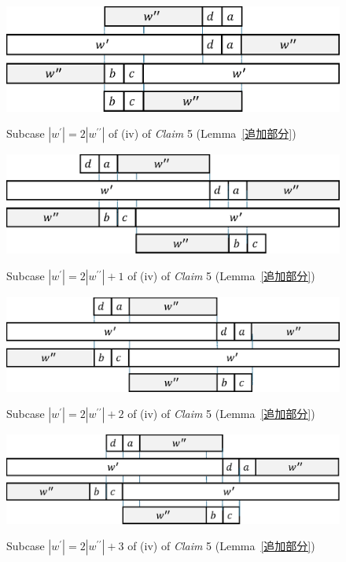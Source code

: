 \begin{figure}[t]
\begin{center}
  \includegraphics[scale=0.45]{figs/w=2w_1.eps}
  \caption{Subcase $|w^{\prime}| = 2|w^{\prime\prime}|$ of (iv) of \textit{Claim} 5 (Lemma~\ref{追加部分})}\label{追加部分14}
  \bigskip
  \includegraphics[scale=0.45]{figs/w=2w_1+1.eps}
  \caption{Subcase $|w^{\prime}| = 2|w^{\prime\prime}| + 1$ of (iv) of \textit{Claim} 5 (Lemma~\ref{追加部分})}\label{追加部分13}
  \bigskip
  \includegraphics[scale=0.45]{figs/w=2w_1+2.eps}
  \caption{Subcase $|w^{\prime}| = 2|w^{\prime\prime}| + 2$ of (iv) of \textit{Claim} 5 (Lemma~\ref{追加部分})}\label{追加部分12}
  \bigskip
  \includegraphics[scale=0.45]{figs/w=2w_1+3.eps}
  \caption{Subcase $|w^{\prime}| = 2|w^{\prime\prime}| + 3$ of (iv) of \textit{Claim} 5 (Lemma~\ref{追加部分})}\label{追加部分11}
\end{center}
\end{figure}

